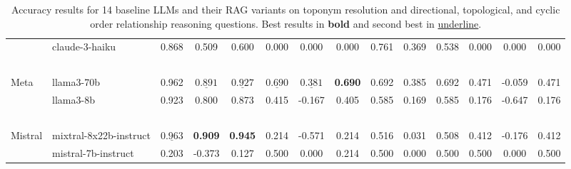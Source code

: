 \begin{table*}[ht]
\begin{tabular}{l|lccc|ccc|ccc|ccc}
        ~       & claude-3-haiku         & 0.868 & 0.509  & 0.600 & 0.000  & 0.000 & 0.000 & 0.761 & 0.369 & 0.538 & 0.000 & 0.000  & 0.000\\ %
        ~       & ~                      & ~ & ~ & ~ & ~  & ~ & ~ & ~ & ~ & ~ & ~  & ~ & ~ \\
        Meta    & llama3-70b             & 0.962 & $\underline{0.891}$  & $\underline{0.927}$ & $\underline{0.690}$ & $\underline{0.381}$  & \textbf{0.690} & 0.692 & 0.385 & 0.692 & 0.471 & -0.059 & 0.471\\ %
        ~       & llama3-8b              & 0.923 & 0.800  & 0.873 & 0.415 & -0.167 & 0.405 & 0.585 & 0.169 & 0.585 & 0.176 & -0.647 & 0.176 \\ %
        ~       & ~                      & ~ & ~ & ~ & ~  & ~ & ~ & ~ & ~ & ~ & ~  & ~ & ~ \\
        Mistral & mixtral-8x22b-instruct & $\underline{0.963}$ & \textbf{0.909}  & \textbf{0.945} & 0.214 & -0.571 & 0.214 & 0.516 & 0.031 & 0.508 & 0.412 & -0.176 & 0.412\\ %
        ~       & mistral-7b-instruct    & 0.203 & -0.373 & 0.127 & 0.500 & 0.000  & 0.214 & 0.500 & 0.000 & 0.500 & 0.500 & 0.000  & 0.500 \\ %
    \hline
    \hline
    \end{tabular}
    \caption{Accuracy results for 14 baseline LLMs and their RAG variants on toponym resolution and directional, topological, and cyclic order relationship reasoning questions. Best results in \textbf{bold} and second best in \underline{underline}.}
    \label{tab:models}
\end{table*}